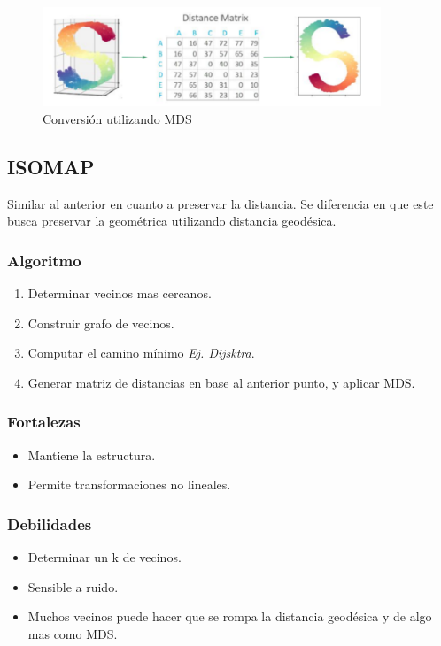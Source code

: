 \documentclass[titlepage,a4paper]{article}
\begin{document}
\begin{figure}[!htb]
    \centering
    \includegraphics[width=0.9\textwidth]{imagenesResumen/MDS.PNG}
    \caption{Conversión utilizando MDS}
\end{figure}


\subsection{ISOMAP}

Similar al anterior en cuanto a preservar la distancia. Se diferencia en que este busca preservar la geométrica utilizando distancia geodésica.

\subsubsection*{Algoritmo}
\begin{enumerate}
    \item Determinar vecinos mas cercanos.
    \item Construir grafo de vecinos.
    \item Computar el camino mínimo \textit{Ej. Dijsktra}.
    \item Generar matriz de distancias en base al anterior punto, y aplicar MDS.
\end{enumerate}

\subsubsection*{Fortalezas}
\begin{itemize}
    \item Mantiene la estructura.
    \item Permite transformaciones no lineales.
\end{itemize}

\subsubsection*{Debilidades}
\begin{itemize}
    \item Determinar un k de vecinos.
    \item Sensible a ruido.
    \item Muchos vecinos puede hacer que se rompa la distancia geodésica y de algo mas como MDS.
\end{itemize}
\end{document}
